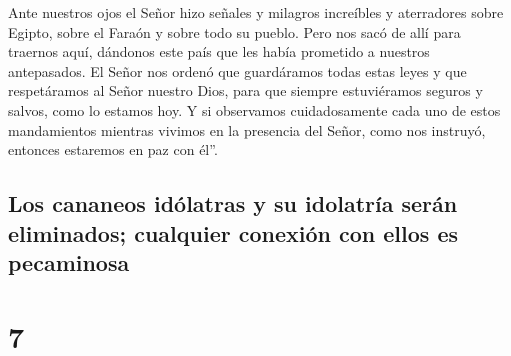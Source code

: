  Ante nuestros ojos el Señor hizo señales y milagros
increíbles y aterradores sobre Egipto, sobre el Faraón y sobre todo su
pueblo.  Pero nos sacó de allí para traernos aquí,
dándonos este país que les había prometido a nuestros antepasados.
 El Señor nos ordenó que guardáramos todas estas leyes y
que respetáramos al Señor nuestro Dios, para que siempre estuviéramos
seguros y salvos, como lo estamos hoy.  Y si observamos
cuidadosamente cada uno de estos mandamientos mientras vivimos en la
presencia del Señor, como nos instruyó, entonces estaremos en paz con
él''.

\hypertarget{los-cananeos-iduxf3latras-y-su-idolatruxeda-seruxe1n-eliminados-cualquier-conexiuxf3n-con-ellos-es-pecaminosa}{%
\subsection{Los cananeos idólatras y su idolatría serán eliminados;
cualquier conexión con ellos es
pecaminosa}\label{los-cananeos-iduxf3latras-y-su-idolatruxeda-seruxe1n-eliminados-cualquier-conexiuxf3n-con-ellos-es-pecaminosa}}

\hypertarget{section-6}{%
\section{7}\label{section-6}}

